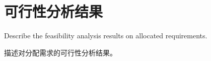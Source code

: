 \chapter{可行性分析结果}
Describe the feasibility analysis results on allocated requirements.

描述对分配需求的可行性分析结果。
